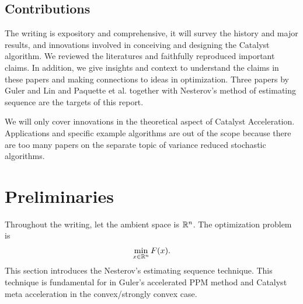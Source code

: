 \documentclass[12pt]{article}
\begin{document}
    \subsection{Contributions}
        The writing is expository and comprehensive, it will survey the history and major results, and innovations involved in conceiving and designing the Catalyst algorithm. 
        We reviewed the literatures and faithfully reproduced important claims.
        In addition, we give insights and context to understand the claims in these papers and making connections to ideas in optimization. 
        Three papers by Guler \cite{guler_new_1992} and Lin \cite{lin_universal_2015} and Paquette et al. \cite{lin_catalyst_2018} together with Nesterov's \cite{nesterov_lectures_2018} method of estimating sequence are the targets of this report. 

        We will only cover innovations in the theoretical aspect of Catalyst Acceleration. 
        Applications and specific example algorithms are out of the scope because there are too many papers on the separate topic of variance reduced stochastic algorithms. 

    
\section{Preliminaries}\label{sec:preliminaries}
    Throughout the writing, let the ambient space is $\mathbb R^n$. 
    The optimization problem is
    \begin{align*}
        \min_{x \in \mathbb R^n} F(x). 
    \end{align*}
    This section introduces the Nesterov's estimating sequence technique. 
    This technique is fundamental for in Guler's accelerated PPM method and Catalyst meta acceleration in the convex/strongly convex case. 
\end{document}
